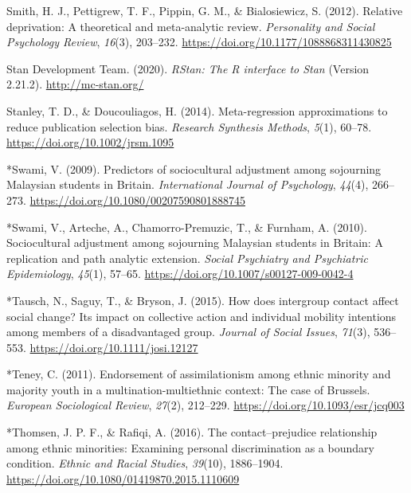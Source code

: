 \documentclass[12pt, letterpaper]{article}
\begin{document}
\leavevmode\hypertarget{ref-smith_relative_2012}{}%
Smith, H. J., Pettigrew, T. F., Pippin, G. M., \& Bialosiewicz, S.
(2012). Relative deprivation: A theoretical and meta-analytic review.
\emph{Personality and Social Psychology Review}, \emph{16}(3), 203--232.
\url{https://doi.org/10.1177/1088868311430825}

\leavevmode\hypertarget{ref-stan_development_team_rstan:_2020}{}%
Stan Development Team. (2020). \emph{RStan: The R interface to Stan}
(Version 2.21.2). \url{http://mc-stan.org/}

\leavevmode\hypertarget{ref-stanley_meta-regression_2014}{}%
Stanley, T. D., \& Doucouliagos, H. (2014). Meta-regression
approximations to reduce publication selection bias. \emph{Research
Synthesis Methods}, \emph{5}(1), 60--78.
\url{https://doi.org/10.1002/jrsm.1095}

\leavevmode\hypertarget{ref-1020}{}%
*Swami, V. (2009). Predictors of sociocultural adjustment among
sojourning Malaysian students in Britain. \emph{International Journal of
Psychology}, \emph{44}(4), 266--273.
\url{https://doi.org/10.1080/00207590801888745}

\leavevmode\hypertarget{ref-733}{}%
*Swami, V., Arteche, A., Chamorro-Premuzic, T., \& Furnham, A. (2010).
Sociocultural adjustment among sojourning Malaysian students in Britain:
A replication and path analytic extension. \emph{Social Psychiatry and
Psychiatric Epidemiology}, \emph{45}(1), 57--65.
\url{https://doi.org/10.1007/s00127-009-0042-4}

\leavevmode\hypertarget{ref-2375}{}%
*Tausch, N., Saguy, T., \& Bryson, J. (2015). How does intergroup
contact affect social change? Its impact on collective action and
individual mobility intentions among members of a disadvantaged group.
\emph{Journal of Social Issues}, \emph{71}(3), 536--553.
\url{https://doi.org/10.1111/josi.12127}

\leavevmode\hypertarget{ref-46}{}%
*Teney, C. (2011). Endorsement of assimilationism among ethnic minority
and majority youth in a multination-multiethnic context: The case of
Brussels. \emph{European Sociological Review}, \emph{27}(2), 212--229.
\url{https://doi.org/10.1093/esr/jcq003}

\leavevmode\hypertarget{ref-1412}{}%
*Thomsen, J. P. F., \& Rafiqi, A. (2016). The contact--prejudice
relationship among ethnic minorities: Examining personal discrimination
as a boundary condition. \emph{Ethnic and Racial Studies},
\emph{39}(10), 1886--1904.
\url{https://doi.org/10.1080/01419870.2015.1110609}
\end{document}
